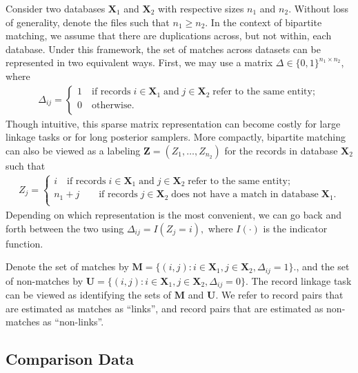 \documentclass[12pt,letterpaper]{article}
\newcommand{\1}[1]{\mathbb{I}\!\left[#1\right]} %
\begin{document}
Consider two databases $\bm{X}_1$ and $\bm{X}_2$ with respective sizes $n_1$ and $n_2$. Without loss of generality, denote the files such that $n_1 \geq n_2$. In the context of bipartite matching, we assume that there are duplications across, but not within, each database. Under this framework, the set of matches across datasets can be represented in two equivalent ways. First, we may use a matrix $\Delta \in \{0, 1\}^{n_1 \times n_2}$, where
\begin{align}
	\Delta_{ij} =
	\begin{cases}
		1 \quad \text{if records}\;  i \in \bm{X}_1 \; \text{and}\; j\in \bm{X}_2 \; \text{refer to the same entity}; \\
		0 \quad \text{otherwise}.\\
	\end{cases}
\end{align}
Though intuitive, this sparse matrix representation can become costly for large linkage tasks or for long posterior samplers. More compactly, bipartite matching can also be viewed as a labeling $\bm{Z} = (Z_1, \ldots, Z_{n_2})$ for the records in database $\bm{X}_2$ such that 
\begin{align}
	Z_{j} =
	\begin{cases}
		i \quad \text{if records}\;  i \in \bm{X}_1 \; \text{and}\; j\in \bm{X}_2 \; \text{refer to the same entity}; \\
		n_1 + j \quad  \quad \text{if records}\;  j \in \bm{X}_2 \; \text{does not have a match in database}\; \bm{X}_1. \\
	\end{cases}
\end{align}
Depending on which representation is the most convenient, we can go back and forth between the two using $\Delta_{ij} = I(Z_j = i),$ where $I(\cdot)$ is the indicator function. 

Denote the set of matches by $\bm{M} = \{(i,j): i \in \bm{X}_1, j \in \bm{X}_2, \Delta_{ij} = 1\}.$, and the set of non-matches by 
$\bm{U} =  \{(i,j): i \in \bm{X}_1, j \in \bm{X}_2, \Delta_{ij} = 0\}.$ The record linkage task can be viewed as identifying the sets of  $\bm{M}$ and  $\bm{U}.$ We refer to record pairs that are estimated as matches as ``links'', and record pairs that are estimated as non-matches as ``non-links''.

\subsection{Comparison Data}
\label{comparison-data}
\end{document}
